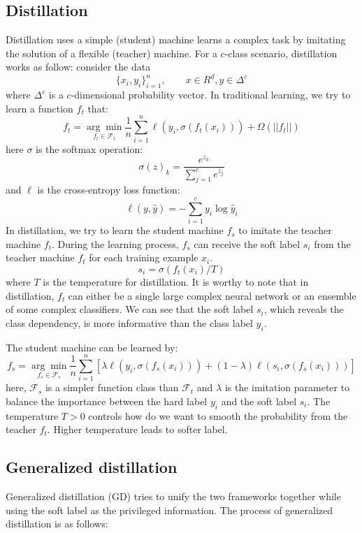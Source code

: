 \documentclass[11pt,onecolumn]{article}
\begin{document}
\subsection{Distillation}
Distillation uses a simple (student) machine learns a complex task by imitating the solution of a flexible (teacher) machine. For a $c$-class scenario, distillation works as follow: consider the data
\[\{x_i,y_i\}_{i=1}^n, \qquad x\in R^d, y\in \Delta^c\]
where $\Delta^c$ is a $c$-dimensional probability vector. In traditional learning, we try to learn a function $f_t$ that:
\begin{equation}\label{eq:normal}
f_t=\underset{f_t \in \mathcal{F}_t}{\arg \min}\frac{1}{n}\sum_{i=1}^{n}\ell\left(y_i,\sigma(f_t(x_i))\right)+\Omega(||f_t||)
\end{equation}
here $\sigma$ is the softmax operation:
\[\sigma(z)_k=\frac{e^{z_k}}{\sum_{j=1}^{c}e^{z_j}}\]
and $\ell$ is the cross-entropy loss function:
\[\ell(y,\hat{y})=-\sum_{i=1}^{c}y_i\log\hat{y}_i\]
In distillation, we try to learn the student machine $f_s$ to imitate the teacher machine $f_t$. During the learning process, $f_s$ can receive the soft label $s_i$ from the teacher machine $f_t$ for each training example $x_i$.
\begin{equation}\label{eq:softmax_T}
s_i=\sigma(f_t(x_i)/T)
\end{equation}
where $T$ is the temperature for distillation. It is worthy to note that in distillation, $f_t$ can either be a single large complex neural network or an ensemble of some complex classifiers. We can see that the soft label $s_i$, which reveals the class dependency, is more informative than the class label $y_i$.

The student machine can be learned by:
\begin{equation}\label{eq:distill}
f_s=\underset{f_s \in \mathcal{F}_s}{\arg \min}\frac{1}{n}\sum_{i=1}^{n}\left[\lambda\ell\left(y_i,\sigma(f_s(x_i))\right)+(1-\lambda)\ell\left(s_i,\sigma(f_s(x_i))\right)\right]
\end{equation}
here, $\mathcal{F}_s$ is a simpler function class than $\mathcal{F}_t$ and $\lambda$ is the imitation parameter to balance the importance between the hard label $y_i$ and the soft label $s_i$. The temperature $T>0$ controls how do we want to smooth the probability from the teacher $f_t$. Higher temperature leads to softer label.

\subsection{Generalized distillation}
Generalized distillation (GD) tries to unify the two frameworks together while using the soft label as the privileged information. The process of generalized distillation is as follows:
\end{document}
